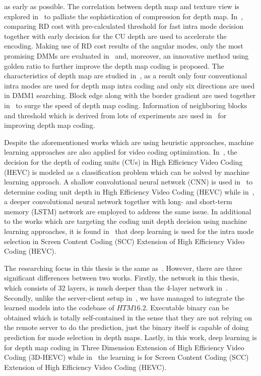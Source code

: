 as early as possible.
The correlation between depth map and texture view is explored
in~\parencite{RN94} to palliate the sophistication of
compression for depth map.
In~\parencite{RN212}, comparing RD cost with pre-calculated threshold for fast
intra mode decision together with early decision for the CU depth are used
to accelerate the encoding.
Making use of RD cost results of the angular modes, only the most promising
DMMs are evaluated in~\parencite{RN87} and, moreover, an innovative
method using golden ratio to further improve the
depth map coding is proposed.
The characteristics of depth map are studied in~\parencite{RN91},
as a result only four conventional intra modes are used for
depth map intra coding and only six directions are used in DMM1 searching.
Block edge along with the border gradient are used together
in~\parencite{RN114} to surge the speed of depth map coding.
Information of neighboring blocks and threshold which is derived from
lots of experiments are used in~\parencite{RN85} for improving depth
map coding.

Despite the aforementioned works which are using heuristic approaches,
machine learning approaches are also applied for video coding optimization.
In~\parencite{RN74}, the decision for the depth of coding units (CUs)
in High Efficiency Video Coding (HEVC) is modeled as a classification
problem which can be solved by machine learning approach.
A shallow convolutional neural network (CNN) is
used in~\parencite{RN78} to determine coding unit depth in
High Efficiency Video Coding (HEVC) while
in~\parencite{DBLP:journals-corr-abs-1710-01218}, a deeper convolutional
neural network together with long- and short-term memory (LSTM) network
are employed to address the same issue.
In additional to the works which are targeting the
coding unit depth decision using machine learning approaches, it is found
in~\parencite{RN73} that deep learning is used for the intra mode
selection in Screen Content Coding (SCC)
Extension of High Efficiency Video Coding (HEVC).

The researching focus in this thesis is the same as~\parencite{RN73}.
However, there are three significant differences between two works.
Firstly, the network in this thesis, which consists of 32 layers, is
much deeper than the 4-layer network in~\parencite{RN73}.
Secondly, unlike the server-client setup in~\parencite{RN73}, we have
managed to integrate the learned models into the codebase of \(HTM16.2\).
Executable binary can be obtained which is totally self-contained in the
sense that they are not relying on the remote server to do the prediction,
just the binary itself is capable of doing prediction
for mode selection in depth maps.
Lastly, in this work, deep learning is for depth map coding in
Three Dimension Extension of High Efficiency Video Coding (3D-HEVC)
while in~\parencite{RN73} the learning is for Screen Content Coding (SCC)
Extension of High Efficiency Video Coding (HEVC).
% 